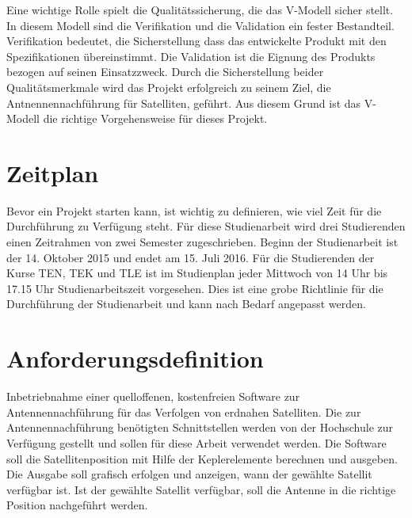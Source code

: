 Eine wichtige Rolle spielt die Qualitätssicherung, die das V-Modell sicher stellt. In diesem Modell sind die Verifikation und die Validation ein 
fester Bestandteil. Verifikation bedeutet, die Sicherstellung dass das entwickelte Produkt mit den Spezifikationen übereinstimmt.
Die Validation ist die Eignung des Produkts bezogen auf seinen Einsatzzweck. Durch die Sicherstellung beider Qualitätsmerkmale wird das Projekt 
erfolgreich zu seinem Ziel, die Antnennennachführung für Satelliten, geführt. Aus diesem Grund ist das V-Modell die richtige Vorgehensweise für 
dieses Projekt.
\newpar

\section{Zeitplan}
Bevor ein Projekt starten kann, ist wichtig  zu definieren, wie viel Zeit für die Durchführung zu Verfügung steht. Für diese Studienarbeit 
wird drei Studierenden einen Zeitrahmen von zwei Semester zugeschrieben. Beginn der Studienarbeit ist der 14. Oktober 2015 und endet am 15. Juli 
2016. Für die Studierenden der Kurse TEN, TEK und TLE ist im Studienplan jeder Mittwoch von 14 Uhr bis 17.15 Uhr Studienarbeitszeit vorgesehen. Dies 
ist eine grobe Richtlinie für die Durchführung der Studienarbeit und kann nach Bedarf angepasst werden.
\newpar

\section{Anforderungsdefinition}
Inbetriebnahme einer quelloffenen, kostenfreien Software zur Antennennachführung für das Verfolgen von erdnahen Satelliten. Die zur 
Antennennachführung
benötigten Schnittstellen werden von der Hochschule zur Verfügung gestellt und sollen für diese Arbeit verwendet werden. Die Software soll die 
Satellitenposition mit Hilfe der Keplerelemente berechnen und ausgeben. Die Ausgabe soll grafisch erfolgen und anzeigen, wann
der gewählte Satellit verfügbar ist. Ist der gewählte Satellit verfügbar, soll die Antenne in die richtige Position nachgeführt werden. 
\newpar

